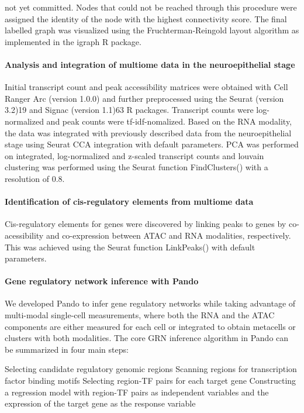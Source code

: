 not yet committed. Nodes that could not be reached through this procedure were assigned the identity of the node with the highest connectivity score. The final labelled graph was visualized using the Fruchterman-Reingold layout algorithm as implemented in the igraph R package.
 
\paragraph{Analysis and integration of multiome data in the neuroepithelial stage}
Initial transcript count and peak accessibility matrices were obtained with Cell Ranger Arc (version 1.0.0) and further preprocessed using the Seurat (version 3.2)19 and Signac (version 1.1)63 R packages. Transcript counts were log-normalized and peak counts were tf-idf-nomalized. Based on the RNA modality, the data was integrated with previously described data from the neuroepithelial stage using Seurat CCA integration with default parameters. PCA was performed on integrated, log-normalized and z-scaled transcript counts and louvain clustering was performed using the Seurat function FindClusters() with a resolution of 0.8.
 
\paragraph{Identification of cis-regulatory elements from multiome data}
Cis-regulatory elements for genes were discovered by linking peaks to genes by co-acessibility and co-expression between ATAC and RNA modalities, respectively. This was achieved using the Seurat function LinkPeaks() with default parameters.
 
\paragraph{Gene regulatory network inference with Pando}
We developed Pando to infer gene regulatory networks while taking advantage of multi-modal single-cell measurements, where both the RNA and the ATAC components are either measured for each cell or integrated to obtain metacells or clusters with both modalities. The core GRN inference algorithm in Pando can be summarized in four main steps:
 
Selecting candidate regulatory genomic regions
Scanning regions for transcription factor binding motifs
Selecting region-TF pairs for each target gene
Constructing a regression model with region-TF pairs as independent variables and the expression of the target gene as the response variable
 
